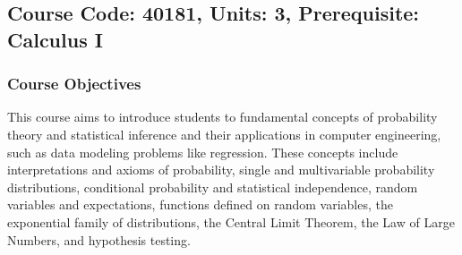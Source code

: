 \documentclass[12pt]{article}
\begin{document}
\subsection*{Course Code: 40181, Units: 3, Prerequisite: Calculus I}

\subsubsection*{Course Objectives}
This course aims to introduce students to fundamental concepts of probability theory and statistical inference and their applications in computer engineering, such as data modeling problems like regression. These concepts include interpretations and axioms of probability, single and multivariable probability distributions, conditional probability and statistical independence, random variables and expectations, functions defined on random variables, the exponential family of distributions, the Central Limit Theorem, the Law of Large Numbers, and hypothesis testing.
\end{document}
